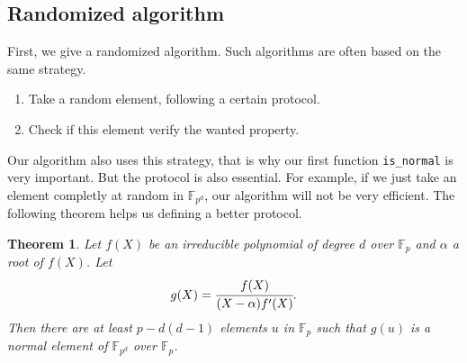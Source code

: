 \documentclass[a4paper,11pt]{article}
\theoremstyle{break}
\newtheorem{thm}{Theorem}[section]
\theoremstyle{sc}
\theoremstyle{definition}
\theoremstyle{remark}
\begin{document}
\subsection{Randomized algorithm}
First, we give a randomized algorithm. Such algorithms are often based on the
same strategy.
\begin{enumerate}
  \item Take a random element, following a certain protocol.
  \item Check if this element verify the wanted property.
\end{enumerate}
Our algorithm also uses this strategy, that is why our first function
\texttt{is\_normal} is very important. But the protocol is also essential.
For example, if we just take an element completly at random in
$\mathbb{F}_{p^d}$, our algorithm will not be very efficient. The following
theorem helps us defining a better protocol.
\begin{thm}
  Let $f(X)$ be an irreducible polynomial of degree $d$ over
  $\mathbb{F}_p$ and $\alpha$ a root of $f(X)$. Let
  \[
    g(X)=\cfrac{f(X)}{(X-\alpha)f'(X)}.
  \]
  Then there are at least $p -d(d-1)$ elements $u$ in $\mathbb{F}_p$ such that
  $g(u)$ is a normal element of $\mathbb{F}_{p^d}$ over $\mathbb{F}_p$.
\end{thm}
\end{document}
